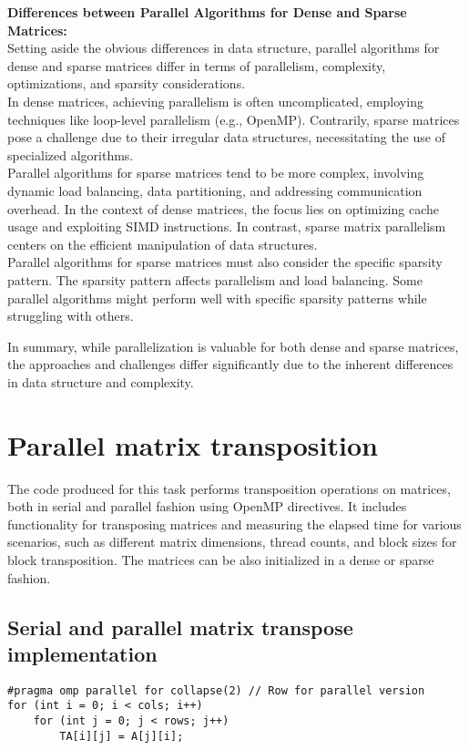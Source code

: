 \documentclass{article}
\begin{document}
\textbf{Differences between Parallel Algorithms for Dense and Sparse Matrices:}\\
Setting aside the obvious differences in data structure, parallel algorithms for dense and sparse matrices differ in terms of parallelism, complexity, optimizations, and sparsity considerations.\\
In dense matrices, achieving parallelism is often uncomplicated, employing techniques like loop-level parallelism (e.g., OpenMP). Contrarily, sparse matrices pose a challenge due to their irregular data structures, necessitating the use of specialized algorithms.\\
Parallel algorithms for sparse matrices tend to be more complex, involving dynamic load balancing, data partitioning, and addressing communication overhead.
In the context of dense matrices, the focus lies on optimizing cache usage and exploiting SIMD instructions. 
In contrast, sparse matrix parallelism centers on the efficient manipulation of data structures.\\
Parallel algorithms for sparse matrices must also consider the specific sparsity pattern. The sparsity pattern affects parallelism and load balancing. Some parallel algorithms might perform well with specific sparsity patterns while struggling with others.

In summary, while parallelization is valuable for both dense and sparse matrices, the approaches and challenges differ significantly due to the inherent differences in data structure and complexity.
\clearpage
\section{Parallel matrix transposition}

The code produced for this task performs transposition operations on matrices, both in serial and parallel fashion using OpenMP directives. It includes functionality for transposing matrices and measuring the elapsed time for various scenarios, such as different matrix dimensions, thread counts, and block sizes for block transposition. The matrices can be also initialized in a dense or sparse fashion.

\subsection*{Serial and parallel matrix transpose implementation}

\begin{code}
    \caption{\label{code:serial-parallel-transpose}}
    \begin{verbatim}
#pragma omp parallel for collapse(2) // Row for parallel version
for (int i = 0; i < cols; i++)
    for (int j = 0; j < rows; j++)
        TA[i][j] = A[j][i];
    \end{verbatim}
\end{code}
\end{document}
